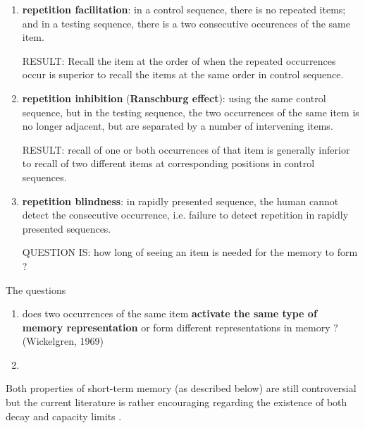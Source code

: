 \begin{enumerate}
  \item {\bf repetition facilitation}: in a control sequence, there is no
  repeated items; and in a testing sequence, there is a two consecutive
  occurences of the same item. 
  
  RESULT: Recall the item at the order of when the repeated occurrences occur is
  superior to recall the items at the same order in control sequence.
  
  \item {\bf repetition inhibition} ({\bf Ranschburg effect}): using the same
  control sequence, but in the testing sequence, the two occurrences of the same
  item is no longer adjacent, but are separated by a number of intervening
  items.
  
  RESULT: recall of one or both occurrences of that item is generally inferior
  to recall of two different items at corresponding positions in control
  sequences.

  \item {\bf repetition blindness}: in rapidly presented sequence, the human
  cannot detect the consecutive occurrence, i.e.  failure to detect repetition
  in rapidly presented sequences.
  
  QUESTION IS: how long of seeing an item is needed for the memory to form
  ?
  
\end{enumerate}

The questions
\begin{enumerate}
  \item does two occurrences of the same item {\bf activate the same type of
  memory representation} or form different representations in memory ?
  (Wickelgren, 1969)
  

  \item 
\end{enumerate}

Both properties of short-term memory (as described below) are still
controversial but the current literature is rather encouraging regarding the
existence of both decay and capacity limits \citep{cowan2008}.

